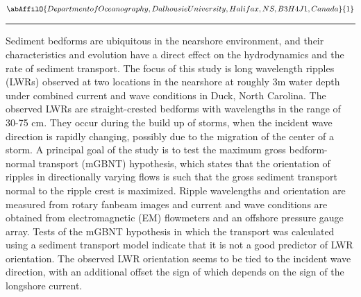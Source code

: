 \begin{center}
   \vspace{2 mm} \begin{center}
    \vspace{2 mm}\begin{center}
  
  $\abAffilO{Department of Oceanography, Dalhousie University, Halifax, NS, B3H 4J1, Canada}{1}$

  \end{center}
  \vspace{2 mm}
  \end{center}\end{center}
  \begin{center}\rule{0.70\linewidth}{0.5 pt}\end{center}

\noindent Sediment bedforms are ubiquitous in the nearshore environment, and their characteristics and evolution have a direct effect on the hydrodynamics and the rate of sediment transport. The focus of this study is long wavelength ripples (LWRs) observed at two locations in the nearshore at roughly 3m water depth under combined current and wave conditions in Duck, North Carolina. The observed LWRs are straight-crested bedforms with wavelengths in the range of 30-75 cm. They occur during the build up of storms, when the incident wave direction is rapidly changing, possibly due to the migration of the center of a storm. A principal goal of the study is to test the maximum gross bedform-normal transport (mGBNT) hypothesis, which states that the orientation of ripples in directionally varying flows is such that the gross sediment transport normal to the ripple crest is maximized. Ripple wavelengths and orientation are measured from rotary fanbeam images and current and wave conditions are obtained from electromagnetic (EM) flowmeters and an offshore pressure gauge array. Tests of the mGBNT hypothesis in which the transport was calculated using a sediment transport model indicate that it is not a good predictor of LWR orientation. The observed LWR orientation seems to be tied to the incident wave direction, with an additional offset the sign of which depends on the sign of the longshore current.

